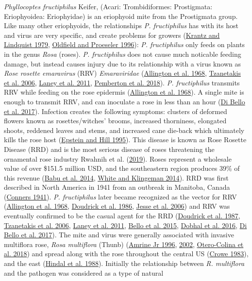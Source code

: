\documentclass{ufdissertation}[overrideChapters] %
\begin{document}
{\emph{Phyllocoptes fructiphilus} Keifer, (Acari: Trombidiformes: Prostigmata: Eriophyoidea: Eriophyidae) is an eriophyoid mite from the Prostigmata group. Like many other eriophyoids, the relationships \emph{P. fructiphilus} has with its host and virus are very specific, and create problems for growers (\protect\hyperlink{ref-Krantz1979}{Krantz and Lindquist 1979}, \protect\hyperlink{ref-Oldfield1996a}{Oldfield and Proeseler 1996}): \emph{P. fructiphilus} only feeds on plants in the genus \emph{Rosa} (roses). \emph{P. fructiphilus} does not cause much noticable feeding damage, but instead causes injury due to its relationship with a virus known as \emph{Rose rosette emaravirus} (RRV) \emph{Emaraviridae} (\protect\hyperlink{ref-Allington1968}{Allington et al. 1968}, \protect\hyperlink{ref-Tzanetakis2006}{Tzanetakis et al. 2006}, \protect\hyperlink{ref-Laney2011}{Laney et al. 2011}, \protect\hyperlink{ref-Pemberton2018}{Pemberton et al. 2018}). \emph{P. fructiphilus} transmits RRV while feeding on the rose epidermis (\protect\hyperlink{ref-Allington1968}{Allington et al. 1968}). A single mite is enough to transmit RRV, and can inoculate a rose in less than an hour (\protect\hyperlink{ref-Bello2017}{Di Bello et al. 2017}). Infection creates the following symptoms: clusters of deformed flowers known as rosettes/witches' brooms, increased thorniness, elongated shoots, reddened leaves and stems, and increased cane die-back which ultimately kills the rose host (\protect\hyperlink{ref-Epstein1995}{Epstein and Hill 1995}). This disease is known as Rose Rosette Disease (RRD) and is the most serious disease of roses threatening the ornamental rose industry Rwahnih et al. (\protect\hyperlink{ref-Rwahnih2019}{2019}). Roses represent a wholesale value of over \$151.5 million USD, and the southeastern region produces 39\% of this revenue (\protect\hyperlink{ref-Babu2014}{Babu et al. 2014}, \protect\hyperlink{ref-White2014}{White and Klingeman 2014}). RRD was first described in North America in 1941 from an outbreak in Manitoba, Canada (\protect\hyperlink{ref-Conners1941}{Conners 1941}). \emph{P. fructiphilus} later became recognized as the vector for RRV (\protect\hyperlink{ref-Allington1968}{Allington et al. 1968}, \protect\hyperlink{ref-Doudrick1986}{Doudrick et al. 1986}, \protect\hyperlink{ref-Jesse2006}{Jesse et al. 2006}) and RRV was eventually confirmed to be the casual agent for the RRD (\protect\hyperlink{ref-Doudrick1987}{Doudrick et al. 1987}, \protect\hyperlink{ref-Tzanetakis2006}{Tzanetakis et al. 2006}, \protect\hyperlink{ref-Laney2011}{Laney et al. 2011}, \protect\hyperlink{ref-Bello2015}{Bello et al. 2015}, \protect\hyperlink{ref-Dobhal2016}{Dobhal et al. 2016}, \protect\hyperlink{ref-Bello2017}{Di Bello et al. 2017}). The mite and virus were generally associated with invasive multiflora rose, \emph{Rosa multiflora} (Thunb) (\protect\hyperlink{ref-Amrine1996}{Amrine Jr 1996}, \protect\hyperlink{ref-Amrine2002}{2002}, \protect\hyperlink{ref-Otero-Colina2018}{Otero-Colina et al. 2018}) and spread along with the rose throughout the central US (\protect\hyperlink{ref-Crowe1983}{Crowe 1983}), and the east (\protect\hyperlink{ref-Hindal1988}{Hindal et al. 1988}). Initially the relationship between \emph{R. multiflora} and the pathogen was considered as a type of natural }
\end{document}
